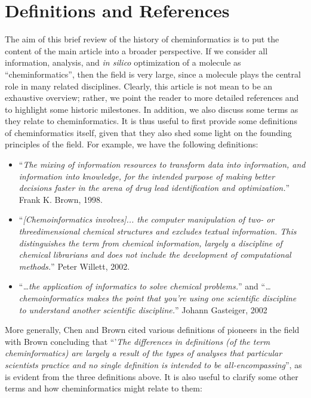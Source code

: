 \documentclass{sig-alternate}
\begin{document}
\section{Definitions and References}
The aim of this brief review of the history of cheminformatics is to
put the content of the main article into a broader perspective. If we
consider all information, analysis, and \emph{in silico} optimization
of a molecule as ``cheminformatics'', then the field is very large,
since a molecule plays the central role in many related
disciplines. Clearly, this article is not mean to be an exhaustive
overview; rather, we point the reader to more detailed references and
to highlight some historic milestones.  In addition, we also discuss
some terms as they relate to cheminformatics.  It is thus useful to
first provide some definitions of cheminformatics itself, given that
they also shed some light on the founding principles of the field. For
example, we have the following definitions:
\begin{itemize}
\item ``\textit{The mixing of information resources to transform data
    into information, and information into knowledge, for the intended
    purpose of making better decisions faster in the arena of drug
    lead identification and optimization.}'' Frank K. Brown, 1998.
\item ``\textit{[Chemoinformatics involves]... the computer
    manipulation of two- or threedimensional chemical structures and
    excludes textual information. This distinguishes the term from
    chemical information, largely a discipline of chemical librarians
    and does not include the development of computational methods.}''
  Peter Willett, 2002.
\item ``\textit{\ldots the application of informatics to solve chemical
    problems.}'' and ``\textit{\ldots chemoinformatics makes the point that
    you're using one scientific discipline to understand another
    scientific discipline.}'' Johann Gasteiger, 2002
\end{itemize}
More generally, Chen\cite{Chen2006} and Brown \cite{brown2009} cited various
definitions of pioneers in the field with Brown concluding that  
``'\textit{The differences in definitions (of the term
  cheminformatics) are largely a result of the types of analyses that
  particular scientists practice and no single definition is intended
  to be all-encompassing}'', as is evident from the three definitions above. 
It is also useful to clarify some other terms and how
cheminformatics might relate to them:
\end{document}
